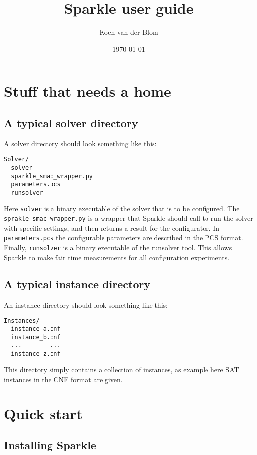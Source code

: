 \documentclass{article}
\title{Sparkle user guide}
\author{Koen van der Blom}
\date{\today}
\begin{document}
\maketitle

\section{Stuff that needs a home}
\subsection{A typical solver directory}

A solver directory should look something like this:

\begin{verbatim}
Solver/
  solver
  sparkle_smac_wrapper.py
  parameters.pcs
  runsolver
\end{verbatim}

Here \texttt{solver} is a binary executable of the solver that is to be configured. The \texttt{sprakle\_smac\_wrapper.py} is a wrapper that Sparkle should call to run the solver with specific settings, and then returns a result for the configurator. In \texttt{parameters.pcs} the configurable parameters are described in the PCS format. Finally, \texttt{runsolver} is a binary executable of the runsolver tool. This allows Sparkle to make fair time measurements for all configuration experiments.

\subsection{A typical instance directory}

An instance directory should look something like this:

\begin{verbatim}
Instances/
  instance_a.cnf
  instance_b.cnf
  ...        ...
  instance_z.cnf
\end{verbatim}

This directory simply contains a collection of instances, as example here SAT instances in the CNF format are given.

\section{Quick start}

\subsection{Installing Sparkle}
\end{document}
